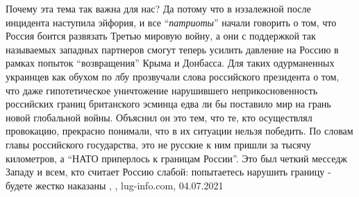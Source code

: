 Почему эта тема так важна для нас? Да потому что в нэзалежной после инцидента
наступила эйфория, и все \enquote{\emph{патриоты}} начали говорить о том, что Россия боится
развязать Третью мировую войну, а они с поддержкой так называемых западных
партнеров смогут теперь усилить давление на Россию в рамках попыток
\enquote{возвращения} Крыма и Донбасса. Для таких одурманенных украинцев как обухом по
лбу прозвучали слова российского президента о том, что даже гипотетическое
уничтожение нарушившего неприкосновенность российских границ британского
эсминца едва ли бы поставило мир на грань новой глобальной войны. Объяснил он
это тем, что те, кто осуществлял провокацию, прекрасно понимали, что в их
ситуации нельзя победить. По словам главы российского государства, это не
русские к ним пришли за тысячу километров, а \enquote{НАТО приперлось к границам
России}. Это был четкий месседж Западу и всем, кто считает Россию слабой:
попытаетесь нарушить границу - будете жестко наказаны
, , lug-info.com, 04.07.2021

